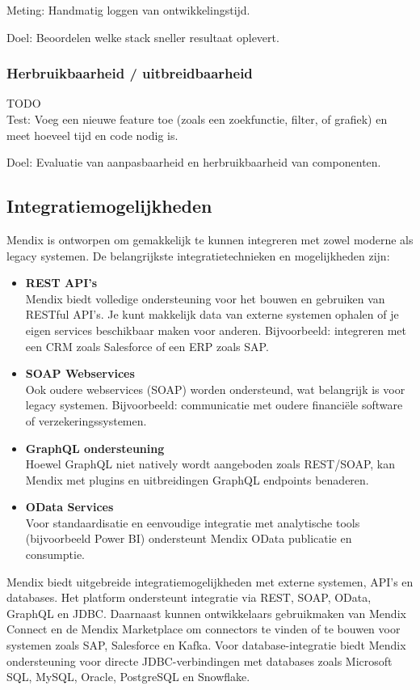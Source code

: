 Meting: Handmatig loggen van ontwikkelingstijd.

Doel: Beoordelen welke stack sneller resultaat oplevert.
\subsubsection{Herbruikbaarheid / uitbreidbaarheid}
TODO
\\
Test: Voeg een nieuwe feature toe (zoals een zoekfunctie, filter, of grafiek) en meet hoeveel tijd en code nodig is.

Doel: Evaluatie van aanpasbaarheid en herbruikbaarheid van componenten.


\subsection{Integratiemogelijkheden}
Mendix is ontworpen om gemakkelijk te kunnen integreren met zowel moderne als legacy systemen. De belangrijkste integratietechnieken en mogelijkheden zijn:
\begin{itemize}
    \item \textbf{REST API's}
    \\
    Mendix biedt volledige ondersteuning voor het bouwen en gebruiken van RESTful API's. Je kunt makkelijk data van externe systemen ophalen of je eigen services beschikbaar maken voor anderen.
    Bijvoorbeeld: integreren met een CRM zoals Salesforce of een ERP zoals SAP.
    \item \textbf{SOAP Webservices}
    \\
    Ook oudere webservices (SOAP) worden ondersteund, wat belangrijk is voor legacy systemen.
    Bijvoorbeeld: communicatie met oudere financiële software of verzekeringssystemen.
    \item \textbf{GraphQL ondersteuning}
    \\
    Hoewel GraphQL niet natively wordt aangeboden zoals REST/SOAP, kan Mendix met plugins en uitbreidingen GraphQL endpoints benaderen.
    \item \textbf{OData Services}
    \\
    Voor standaardisatie en eenvoudige integratie met analytische tools (bijvoorbeeld Power BI) ondersteunt Mendix OData publicatie en consumptie.
\end{itemize}
Mendix biedt uitgebreide integratiemogelijkheden met externe systemen, API’s en databases. Het platform ondersteunt integratie via REST, SOAP, OData, GraphQL en JDBC. Daarnaast kunnen ontwikkelaars gebruikmaken van Mendix Connect en de Mendix Marketplace om connectors te vinden of te bouwen voor systemen zoals SAP, Salesforce en Kafka. Voor database-integratie biedt Mendix ondersteuning voor directe JDBC-verbindingen met databases zoals Microsoft SQL, MySQL, Oracle, PostgreSQL en Snowflake.

